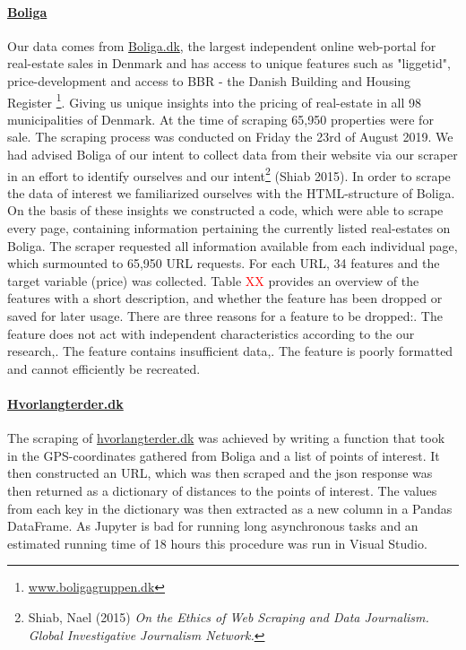 \documentclass[12pt,a4paper]{article}
\begin{document}
\paragraph{\href{https://www.boliga.dk}{Boliga}\newline}
Our data comes from \href{https://www.boliga.dk}{Boliga.dk}, the largest independent online web-portal for real-estate sales in Denmark and has access to unique features such as "liggetid", price-development and access to BBR - the Danish Building and Housing Register \footnote{\href{https://www.boligagruppen.dk}{www.boligagruppen.dk}}. Giving us unique insights into the pricing of real-estate in all 98 municipalities of Denmark. At the time of scraping 65,950 properties were for sale.\newline
The scraping process was conducted on Friday the 23rd of August 2019. We had advised Boliga of our intent to collect data from their website via our scraper in an effort to identify ourselves and our intent\footnote{Shiab, Nael (2015) \textit{On the Ethics of Web Scraping and Data Journalism. Global Investigative Journalism Network.}} (Shiab 2015). In order to scrape the data of interest we familiarized ourselves with the HTML-structure of Boliga. On the basis of these insights we constructed a code, which were able to scrape every page, containing information pertaining the currently listed real-estates on Boliga. The scraper requested all information available from each individual page, which surmounted to 65,950 URL requests. \newline
For each URL, 34 features and the target variable (price) was collected. Table \textcolor{red}{XX} provides an overview of the features with a short description, and whether the feature has been dropped or saved for later usage. There are three reasons for a feature to be dropped:. The feature does not act with independent characteristics according to the our research,. The feature contains insufficient data,. The feature is poorly formatted and cannot efficiently be recreated.
\paragraph{\href{https://www.hvorlangterder.dk}{Hvorlangterder.dk}\newline}
The scraping of \href{https://www.hvorlangterder.dk}{hvorlangterder.dk} was achieved by writing a function that took in the GPS-coordinates gathered from Boliga and a list of points of interest. It then constructed an URL, which was then scraped and the json response was then returned as a dictionary of distances to the points of interest. The values from each key in the dictionary was then extracted as a new column in a Pandas DataFrame.\newline
As Jupyter is bad for running long asynchronous tasks and an estimated running time of 18 hours this procedure was run in Visual Studio.
\end{document}
